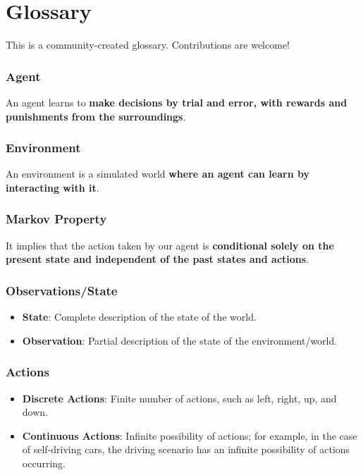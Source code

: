 \documentclass[11pt,a4paper]{article}
\begin{document}
\section{Glossary}\label{glossary}

This is a community-created glossary. Contributions are welcome!

\subsubsection{Agent}\label{agent}

An agent learns to \textbf{make decisions by trial and error, with rewards and punishments from the surroundings}.

\subsubsection{Environment}\label{environment}

An environment is a simulated world \textbf{where an agent can learn by interacting with it}.

\subsubsection{Markov Property}\label{markov-property-1}

It implies that the action taken by our agent is \textbf{conditional solely on the present state and independent of the past states and actions}.

\subsubsection{Observations/State}\label{observationsstate}

\begin{itemize}
\tightlist
\item
  \textbf{State}: Complete description of the state of the world.
\item
  \textbf{Observation}: Partial description of the state of the environment/world.
\end{itemize}

\subsubsection{Actions}\label{actions}

\begin{itemize}
\tightlist
\item
  \textbf{Discrete Actions}: Finite number of actions, such as left, right, up, and down.
\item
  \textbf{Continuous Actions}: Infinite possibility of actions; for example, in the case of self-driving cars, the driving scenario has an infinite possibility of actions occurring.
\end{itemize}
\end{document}

